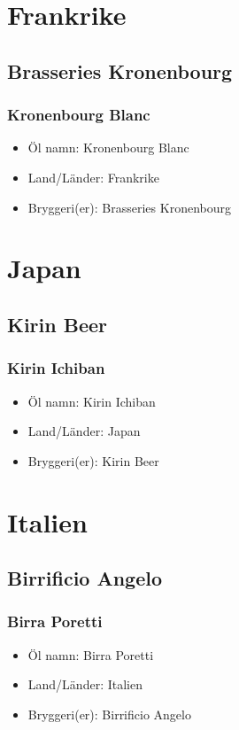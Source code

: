 \documentclass[11pt]{article}
\begin{document}
\section{Frankrike}
\label{sec:org58bed5f}
\subsection{Brasseries Kronenbourg}
\label{sec:org69094c1}
\subsubsection{Kronenbourg Blanc}
\label{sec:orgb478a8d}
\begin{itemize}
\item Öl namn: Kronenbourg Blanc
\item Land/Länder: Frankrike
\item Bryggeri(er): Brasseries Kronenbourg
\end{itemize}
\section{Japan}
\label{sec:orgd1291f8}
\subsection{Kirin Beer}
\label{sec:orgc4489f0}
\subsubsection{Kirin Ichiban}
\label{sec:orgcbd467c}
\begin{itemize}
\item Öl namn: Kirin Ichiban
\item Land/Länder: Japan
\item Bryggeri(er): Kirin Beer
\end{itemize}
\section{Italien}
\label{sec:orgd9005da}
\subsection{Birrificio Angelo}
\label{sec:org606755d}
\subsubsection{Birra Poretti}
\label{sec:org018cc1f}
\begin{itemize}
\item Öl namn: Birra Poretti
\item Land/Länder: Italien
\item Bryggeri(er): Birrificio Angelo
\end{itemize}
\end{document}
